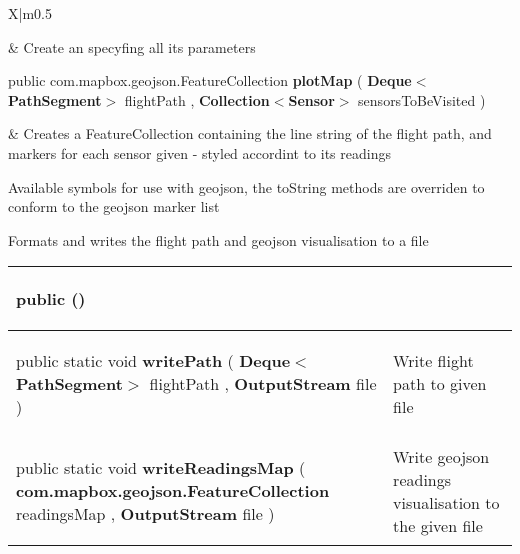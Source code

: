 {\begin{tabularx}{\linewidth}{X|m{0.5\textwidth}}
\begin{raggedleft}
\end{raggedleft} &
 Create an \hyperref[tab:AQMapGenerator]{\color{blue}{AQMapGenerator}} specyfing all its parameters\\ \hline 
\begin{raggedleft}public com.mapbox.geojson.FeatureCollection \textbf{plotMap }(\newline \hfill 
\hspace*{ 5pt} \textbf{Deque$<$PathSegment$>$} flightPath , \newline
 \hspace*{ 5pt} \textbf{Collection$<$Sensor$>$} sensorsToBeVisited  )
\end{raggedleft} &
 Creates a FeatureCollection containing the line string of the flight path, and markers for each sensor given {-} styled accordint to its readings\\\end{tabularx}
}
 {\scriptsize Available symbols for use with geojson, the toString methods are overriden to conform to the geojson marker list
 
\label{tab:MarkerSymbol}
}
 {\scriptsize Formats and writes the flight path and geojson visualisation to a file
 
\vspace*{-5pt} 
\begin{tabularx}{\linewidth}{X|m{}}
\label{tab:OutputFormatter}
\begin{raggedleft}public  \textbf{\hyperref[tab:OutputFormatter]{\color{blue}{OutputFormatter}}}()
\end{raggedleft} &
 \\ \hline 
\begin{raggedleft}public static void \textbf{writePath }(\newline \hfill 
\hspace*{ 5pt} \textbf{Deque$<$PathSegment$>$} flightPath , \newline
 \hspace*{ 5pt} \textbf{OutputStream} file  )
\end{raggedleft} &
 Write flight path to given file\\ \hline 
\begin{raggedleft}public static void \textbf{writeReadingsMap }(\newline \hfill 
\hspace*{ 5pt} \textbf{com.mapbox.geojson.FeatureCollection} readingsMap , \newline
 \hspace*{ 5pt} \textbf{OutputStream} file  )
\end{raggedleft} &
 Write geojson readings visualisation to the given file\\\end{tabularx}
}
